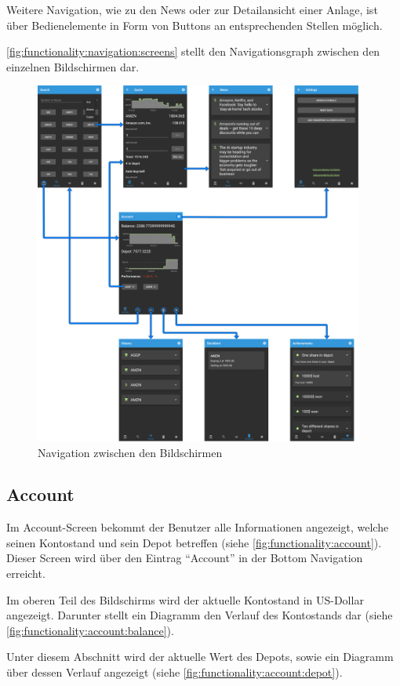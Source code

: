 \documentclass[a4paper]{article}
\begin{document}
Weitere Navigation, wie zu den News oder zur Detailansicht einer Anlage, ist über Bedienelemente in Form von Buttons an entsprechenden Stellen möglich.

\autoref{fig:functionality:navigation:screens} stellt den Navigationsgraph zwischen den einzelnen Bildschirmen dar.
\begin{figure}[H]
	\centering
	\includegraphics[height=12cm]{./images/navigation_screens/navigation_screens.png}
	\caption{Navigation zwischen den Bildschirmen}
	\label{fig:functionality:navigation:screens}
\end{figure}


\subsection{Account}
\label{subsec:functionality:account}
Im Account-Screen bekommt der Benutzer alle Informationen angezeigt, welche seinen Kontostand und sein Depot betreffen (siehe \autoref{fig:functionality:account}). Dieser Screen wird über den Eintrag "`Account"' in der Bottom Navigation erreicht.

Im oberen Teil des Bildschirms wird der aktuelle Kontostand in US-Dollar angezeigt. Darunter stellt ein Diagramm den Verlauf des Kontostands dar (siehe \autoref{fig:functionality:account:balance}).

Unter diesem Abschnitt wird der aktuelle Wert des Depots, sowie ein Diagramm über dessen Verlauf angezeigt (siehe \autoref{fig:functionality:account:depot}).
\end{document}
